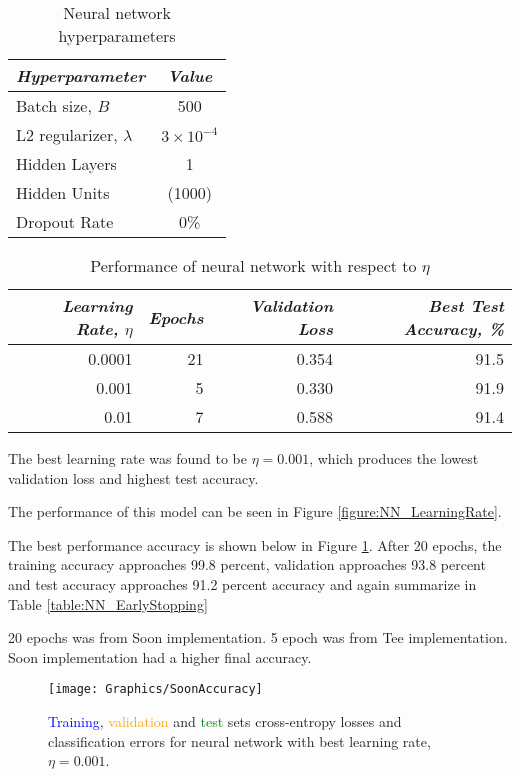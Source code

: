 \documentclass[a4paper,12pt]{article}
\begin{document}
\begin{table}[!htb]
\centering
\caption{Neural network hyperparameters}
\label{table:NN_HParam_2_2_2}
\vspace{0.5em}
\begin{tabular}{|l|c|} \hline
\textit{Hyperparameter} & \textit{Value} \\ \hline
Batch size, $B$ & 500 \\
L2 regularizer, $\lambda$ & $3 \times 10^{-4}$  \\
Hidden Layers & 1 \\
Hidden Units & (1000) \\
Dropout Rate & 0\% \\
\hline
\end{tabular}
\end{table}

\begin{table}[!htb]
\centering
\caption{Performance of neural network with respect to $\eta$}
\label{table:NN_LearningRate}
\vspace{0.5em}
\begin{tabular}{|r|r r r|} \hline
\textit{Learning Rate,} $\eta$ & \textit{Epochs} & \textit{Validation Loss} & \textit{Best Test Accuracy, \%} \\ \hline
0.0001 & 21 & 0.354 & 91.5 \\
0.001 & 5 & 0.330 & 91.9 \\
0.01 & 7 & 0.588 & 91.4 \\
\hline
\end{tabular}
\end{table}

The best learning rate was found to be $\eta = 0.001$, which produces the lowest validation loss and highest test accuracy.

The performance of this model can be seen in Figure \ref{figure:NN_LearningRate}.

The best performance accuracy is shown below in Figure \ref{figure:SoonAccuracy}.
After 20 epochs, the training accuracy approaches 99.8 percent, validation approaches 93.8 percent and test accuracy approaches 91.2 percent accuracy and again summarize in Table  \ref{table:NN_EarlyStopping}

20 epochs was from Soon implementation. 
5 epoch was from Tee implementation. 
Soon implementation had a higher final accuracy. 


\begin{figure}[!htb]
\centering
\texttt{[image: Graphics/SoonAccuracy]}
\caption{\label{figure:SoonAccuracy} \textcolor{blue}{Training}, \textcolor{orange}{validation} and \textcolor{green}{test} sets cross-entropy losses and classification errors for neural network with best learning rate, $\eta = 0.001$.}
\end{figure}
\end{document}
